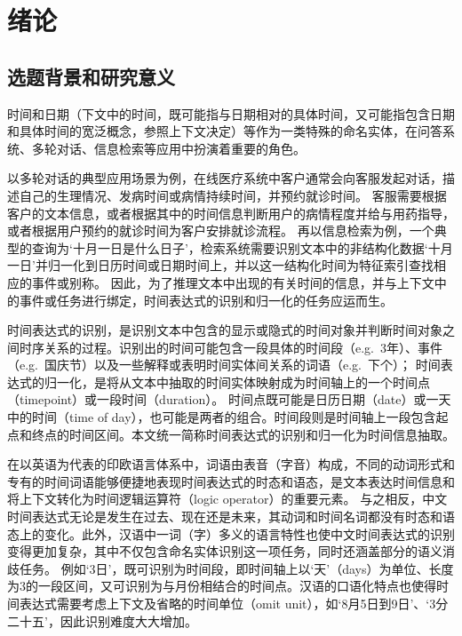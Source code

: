 
\chapter{绪论}

\section{选题背景和研究意义}

时间和日期（下文中的时间，既可能指与日期相对的具体时间，又可能指包含日期和具体时间的宽泛概念，参照上下文决定）等作为一类特殊的命名实体，在问答系统、多轮对话、信息检索等应用中扮演着重要的角色。

以多轮对话的典型应用场景为例，在线医疗系统中客户通常会向客服发起对话，描述自己的生理情况、发病时间或病情持续时间，并预约就诊时间。
客服需要根据客户的文本信息，或者根据其中的时间信息判断用户的病情程度并给与用药指导，或者根据用户预约的就诊时间为客户安排就诊流程。
再以信息检索为例，一个典型的查询为‘十月一日是什么日子’，检索系统需要识别文本中的非结构化数据‘十月一日’并归一化到日历时间或日期时间上，并以这一结构化时间为特征索引查找相应的事件或别称。
因此，为了推理文本中出现的有关时间的信息，并与上下文中的事件或任务进行绑定，时间表达式的识别和归一化的任务应运而生。

时间表达式的识别，是识别文本中包含的显示或隐式的时间对象并判断时间对象之间时序关系的过程。识别出的时间可能包含一段具体的时间段（e.g.\ 3年）、事件（e.g.\ 国庆节）以及一些解释或表明时间实体间关系的词语（e.g.\ 下个）；
时间表达式的归一化，是将从文本中抽取的时间实体映射成为时间轴上的一个时间点（timepoint）或一段时间（duration）。
时间点既可能是日历日期（date）或一天中的时间（time of day），也可能是两者的组合。时间段则是时间轴上一段包含起点和终点的时间区间。本文统一简称时间表达式的识别和归一化为时间信息抽取。

在以英语为代表的印欧语言体系中，词语由表音（字音）构成，不同的动词形式和专有的时间词语能够便捷地表现时间表达式的时态和语态，是文本表达时间信息和将上下文转化为时间逻辑运算符（logic operator）的重要元素。
与之相反，中文时间表达式无论是发生在过去、现在还是未来，其动词和时间名词都没有时态和语态上的变化。此外，汉语中一词（字）多义的语言特性也使中文时间表达式的识别变得更加复杂，其中不仅包含命名实体识别这一项任务，同时还涵盖部分的语义消歧任务。
例如‘3日’，既可识别为时间段，即时间轴上以‘天’（days）为单位、长度为3的一段区间，又可识别为与月份相结合的时间点。汉语的口语化特点也使得时间表达式需要考虑上下文及省略的时间单位（omit unit），如‘8月5日到9日’、‘3分二十五’，因此识别难度大大增加。

